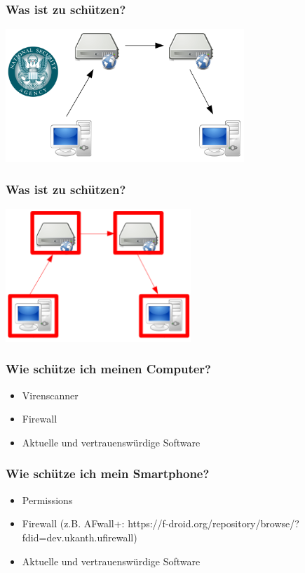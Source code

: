 \documentclass[12pt]{beamer}
\begin{document}
\begin{frame}
    \frametitle{Was ist zu schützen?}
    \begin{center}
      \includegraphics[height=5cm]{img/fed-bad-guy.png}
    \end{center}
\end{frame}

\begin{frame}
    \frametitle{Was ist zu schützen?}
    \begin{center}
      \includegraphics[height=5cm]{img/fed-none.png}
    \end{center}
\end{frame}

\begin{frame}
    \frametitle{Wie schütze ich meinen Computer?}
    \begin{itemize}
      \item Virenscanner
      \item Firewall
      \item Aktuelle und vertrauenswürdige Software
    \end{itemize}
\end{frame}

\begin{frame}
    \frametitle{Wie schütze ich mein Smartphone?}
    \begin{itemize}
      \item Permissions
      \item Firewall (z.B. AFwall+: https://f-droid.org/repository/browse/?fdid=dev.ukanth.ufirewall)
      \item Aktuelle und vertrauenswürdige Software
    \end{itemize}
\end{frame}
\end{document}
